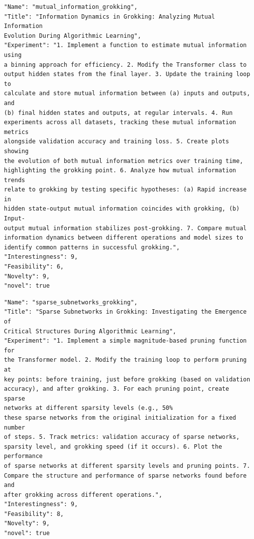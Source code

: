 \begin{tcolorbox}[breakable,colback=blue!5!white, colframe=blue!75!black, title=Idea 15/50 - \texttt{mutual\_information\_grokking}]
\small
\begin{verbatim}
"Name": "mutual_information_grokking",
"Title": "Information Dynamics in Grokking: Analyzing Mutual Information
Evolution During Algorithmic Learning",
"Experiment": "1. Implement a function to estimate mutual information using
a binning approach for efficiency. 2. Modify the Transformer class to
output hidden states from the final layer. 3. Update the training loop to
calculate and store mutual information between (a) inputs and outputs, and
(b) final hidden states and outputs, at regular intervals. 4. Run
experiments across all datasets, tracking these mutual information metrics
alongside validation accuracy and training loss. 5. Create plots showing
the evolution of both mutual information metrics over training time,
highlighting the grokking point. 6. Analyze how mutual information trends
relate to grokking by testing specific hypotheses: (a) Rapid increase in
hidden state-output mutual information coincides with grokking, (b) Input-
output mutual information stabilizes post-grokking. 7. Compare mutual
information dynamics between different operations and model sizes to
identify common patterns in successful grokking.",
"Interestingness": 9,
"Feasibility": 6,
"Novelty": 9,
"novel": true
\end{verbatim}
\end{tcolorbox}

\begin{tcolorbox}[breakable,colback=blue!5!white, colframe=blue!75!black, title=Idea 16/50 - \texttt{sparse\_subnetworks\_grokking}]
\small
\begin{verbatim}
"Name": "sparse_subnetworks_grokking",
"Title": "Sparse Subnetworks in Grokking: Investigating the Emergence of
Critical Structures During Algorithmic Learning",
"Experiment": "1. Implement a simple magnitude-based pruning function for
the Transformer model. 2. Modify the training loop to perform pruning at
key points: before training, just before grokking (based on validation
accuracy), and after grokking. 3. For each pruning point, create sparse
networks at different sparsity levels (e.g., 50%
these sparse networks from the original initialization for a fixed number
of steps. 5. Track metrics: validation accuracy of sparse networks,
sparsity level, and grokking speed (if it occurs). 6. Plot the performance
of sparse networks at different sparsity levels and pruning points. 7.
Compare the structure and performance of sparse networks found before and
after grokking across different operations.",
"Interestingness": 9,
"Feasibility": 8,
"Novelty": 9,
"novel": true
\end{verbatim}
\end{tcolorbox}

